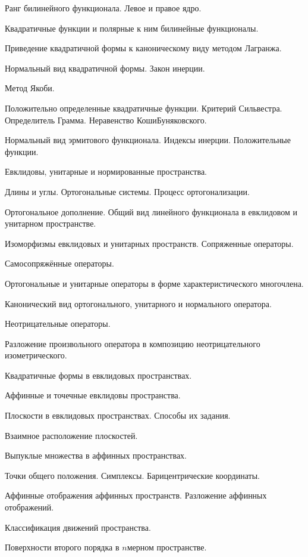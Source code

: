 \documentclass[a4paper]{article}
\begin{document}
\begin{nums}{-1}
\item Ранг билинейного функционала. Левое и правое ядро.
\item Квадратичные функции и полярные к ним билинейные функционалы.
\item Приведение квадратичной формы к каноническому виду методом Лагранжа.
\item Нормальный вид квадратичной формы. Закон инерции.
\item Метод Якоби.
\item Положительно определенные квадратичные функции. Критерий Сильвестра. Определитель Грамма. Неравенство Коши\ч Буняковского.
\item Нормальный вид эрмитового функционала. Индексы инерции. Положительные функции.
\item Евклидовы, унитарные и нормированные пространства.
\item Длины и углы. Ортогональные системы. Процесс ортогонализации.
\item Ортогональное дополнение. Общий вид линейного функционала в евклидовом и унитарном пространстве.
\item Изоморфизмы евклидовых и унитарных пространств. Сопряженные операторы.
\item Самосопряжённые операторы.
\item Ортогональные и унитарные операторы в форме характеристического многочлена.
\item Канонический вид ортогонального, унитарного и нормального оператора.
\item Неотрицательные операторы.
\item Разложение произвольного оператора в композицию неотрицательного  изометрического.
\item Квадратичные формы в евклидовых пространствах.
\item Аффинные и точечные евклидовы пространства.
\item Плоскости в евклидовых пространствах. Способы их задания.
\item Взаимное расположение плоскостей.
\item Выпуклые множества в аффинных пространствах.
\item Точки общего положения. Симплексы. Барицентрические координаты.
\item Аффинные отображения аффинных пространств. Разложение аффинных отображений.
\item Классификация движений пространства.
\item Поверхности второго порядка в $n$\д мерном пространстве.

\end{nums}
\end{document}
